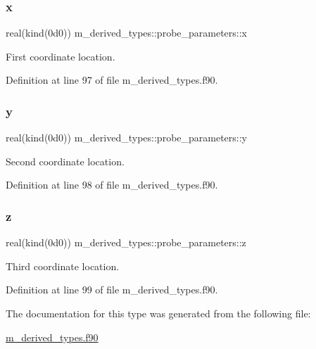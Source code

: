\subsubsection{\texorpdfstring{x}{x}}
{\footnotesize\ttfamily real(kind(0d0)) m\+\_\+derived\+\_\+types\+::probe\+\_\+parameters\+::x}



First coordinate location. 



Definition at line 97 of file m\+\_\+derived\+\_\+types.\+f90.

\mbox{\label{structm__derived__types_1_1probe__parameters_a47d35ecfdaff4ad8b95c9aaf29724ee1}} 
\subsubsection{\texorpdfstring{y}{y}}
{\footnotesize\ttfamily real(kind(0d0)) m\+\_\+derived\+\_\+types\+::probe\+\_\+parameters\+::y}



Second coordinate location. 



Definition at line 98 of file m\+\_\+derived\+\_\+types.\+f90.

\mbox{\label{structm__derived__types_1_1probe__parameters_a27a66fd7ee42fff5836c08b65210d7f3}} 
\subsubsection{\texorpdfstring{z}{z}}
{\footnotesize\ttfamily real(kind(0d0)) m\+\_\+derived\+\_\+types\+::probe\+\_\+parameters\+::z}



Third coordinate location. 



Definition at line 99 of file m\+\_\+derived\+\_\+types.\+f90.



The documentation for this type was generated from the following file\+:\begin{DoxyCompactItemize}
\item 
\hyperlink{m__derived__types_8f90}{m\+\_\+derived\+\_\+types.\+f90}\end{DoxyCompactItemize}
